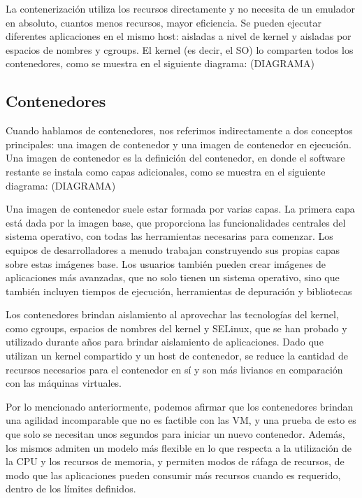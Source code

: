 La contenerización utiliza los recursos directamente y no necesita de un emulador en 
absoluto, cuantos menos recursos, mayor eficiencia. Se pueden ejecutar diferentes 
aplicaciones en el mismo host: aisladas a nivel de kernel y aisladas por 
espacios de nombres y cgroups. El kernel (es decir, el SO) lo comparten todos 
los contenedores, como se muestra en el siguiente diagrama:
(DIAGRAMA)

\subsection*{Contenedores}
Cuando hablamos de contenedores, nos referimos indirectamente a dos conceptos 
principales: una imagen de contenedor y una imagen de contenedor en ejecución. 
Una imagen de contenedor es la definición del contenedor, en donde el software 
restante se instala como capas adicionales, como se muestra en el siguiente diagrama:
(DIAGRAMA)

Una imagen de contenedor suele estar formada por varias capas.
La primera capa está dada por la imagen base, que proporciona las funcionalidades 
centrales del sistema operativo, con todas las herramientas necesarias para comenzar. 
Los equipos de desarrolladores a menudo trabajan construyendo sus propias capas sobre 
estas imágenes base. Los usuarios también pueden crear imágenes de aplicaciones más 
avanzadas, que no solo tienen un sistema operativo, sino que también incluyen tiempos 
de ejecución, herramientas de depuración y bibliotecas

Los contenedores brindan aislamiento al aprovechar las tecnologías del kernel, como 
cgroups, espacios de nombres del kernel y SELinux, que se han probado y utilizado 
durante años para brindar aislamiento de aplicaciones. Dado que  
utilizan un kernel compartido y un host de contenedor, se reduce la cantidad de 
recursos necesarios para el contenedor en sí y son más livianos en comparación 
con las máquinas virtuales. 

Por lo mencionado anteriormente, podemos afirmar que los contenedores brindan una agilidad 
incomparable que no es factible con las VM, y una prueba de esto es que solo se 
necesitan unos segundos para iniciar un nuevo contenedor. 
Además, los mismos admiten un 
modelo más flexible en lo que respecta a la utilización de la CPU y los recursos 
de memoria, y permiten modos de ráfaga de recursos, de modo que las aplicaciones 
pueden consumir más recursos cuando es requerido, dentro de los límites definidos.



